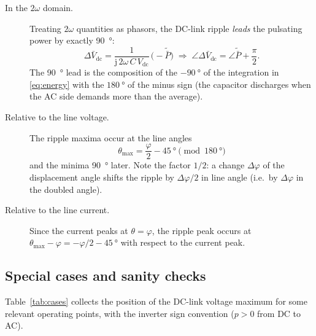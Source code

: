 \documentclass[11pt,a4paper]{article}
\begin{document}
\begin{description}
  \item[In the $2\omega$ domain.] Treating $2\omega$ quantities as phasors, the
        DC-link ripple \emph{leads} the pulsating power by exactly
        \SI{90}{\degree}:
        \begin{equation}
          \Delta \bar V_{\mathrm{dc}} =
          \frac{1}{\mathrm{j}\,2\omega\,C\,V_{\mathrm{dc}}}\,
          \bigl(-\tilde{\bar P}\bigr)
          \;\Longrightarrow\;
          \angle \Delta \bar V_{\mathrm{dc}}
          = \angle \tilde{\bar P} + \frac{\pi}{2}.
        \end{equation}
        The \SI{90}{\degree} lead is the composition of the
        $-\SI{90}{\degree}$ of the integration in \eqref{eq:energy} with the
        $\SI{180}{\degree}$ of the minus sign (the capacitor discharges when the
        AC side demands more than the average).
  \item[Relative to the line voltage.] The ripple maxima occur at the line
        angles
        \begin{equation}
          \boxed{\;\theta_{\max} = \frac{\varphi}{2} - \SI{45}{\degree}
          \pmod{\SI{180}{\degree}} \;}
          \label{eq:thmax}
        \end{equation}
        and the minima \SI{90}{\degree} later. Note the factor $1/2$: a change
        $\Delta\varphi$ of the displacement angle shifts the ripple by
        $\Delta\varphi/2$ in line angle (i.e.\ by $\Delta\varphi$ in the doubled
        angle).
  \item[Relative to the line current.] Since the current peaks at
        $\theta = \varphi$, the ripple peak occurs at
        $\theta_{\max} - \varphi = -\varphi/2 - \SI{45}{\degree}$ with respect
        to the current peak.
\end{description}

\subsection{Special cases and sanity checks}

Table~\ref{tab:cases} collects the position of the DC-link voltage maximum for
some relevant operating points, with the inverter sign convention
($p > 0$ from DC to AC).
\end{document}

